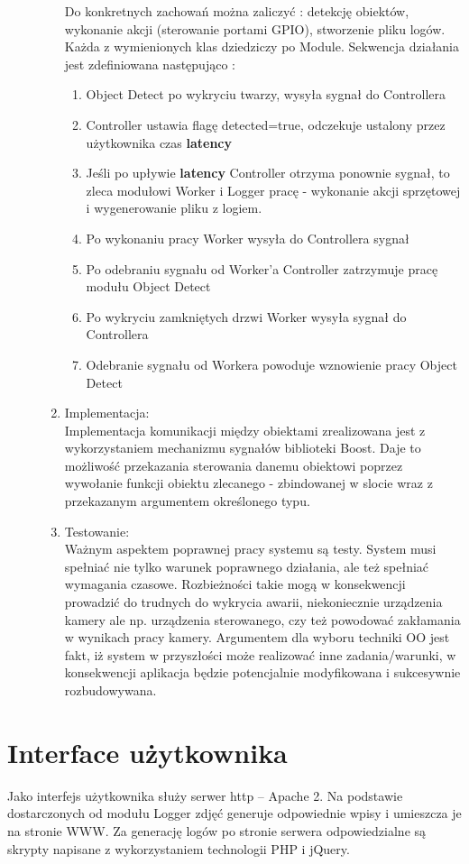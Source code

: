 \begin{description}
\begin{enumerate}[noitemsep]
Do konkretnych zachowań można zaliczyć : detekcję obiektów, wykonanie akcji (sterowanie portami GPIO), stworzenie pliku logów. Każda z wymienionych klas dziedziczy po Module.
Sekwencja działania jest zdefiniowana następująco :
\begin{enumerate}[noitemsep]
\item Object Detect po wykryciu twarzy, wysyła sygnał do Controllera
\item Controller ustawia flagę detected=true, odczekuje ustalony przez użytkownika czas \textbf{latency }
\item Jeśli po upływie \textbf{latency} Controller otrzyma ponownie sygnał, to zleca modułowi Worker i Logger pracę - wykonanie akcji sprzętowej i wygenerowanie pliku z logiem.
\item Po wykonaniu pracy Worker wysyła do Controllera sygnał
\item Po odebraniu sygnału od Worker’a Controller zatrzymuje pracę modułu Object Detect
\item Po wykryciu zamkniętych drzwi Worker wysyła sygnał do Controllera
\item Odebranie sygnału od Workera powoduje wznowienie pracy Object Detect
\end{enumerate}
\item Implementacja: \\
Implementacja komunikacji między obiektami zrealizowana jest z wykorzystaniem mechanizmu sygnałów biblioteki Boost. Daje to możliwość przekazania sterowania danemu obiektowi poprzez wywołanie funkcji obiektu zlecanego - zbindowanej w slocie wraz z przekazanym argumentem określonego typu.
\item Testowanie: \\
Ważnym aspektem poprawnej pracy systemu są testy. System musi spełniać nie tylko warunek poprawnego działania, ale też spełniać wymagania czasowe. Rozbieżności takie mogą w konsekwencji prowadzić do trudnych do wykrycia awarii, niekoniecznie urządzenia kamery ale np. urządzenia sterowanego, czy też powodować zakłamania w wynikach pracy kamery.
Argumentem dla wyboru techniki OO jest fakt, iż system w przyszłości może realizować inne zadania/warunki, w konsekwencji aplikacja będzie potencjalnie modyfikowana i sukcesywnie rozbudowywana.
\end{enumerate}
\end{description}

\section{Interface użytkownika}
Jako interfejs użytkownika służy serwer http – Apache 2. Na podstawie dostarczonych od modułu Logger  zdjęć generuje odpowiednie wpisy i umieszcza je na stronie WWW. Za generację logów po stronie serwera odpowiedzialne są skrypty napisane z wykorzystaniem technologii PHP i jQuery.

